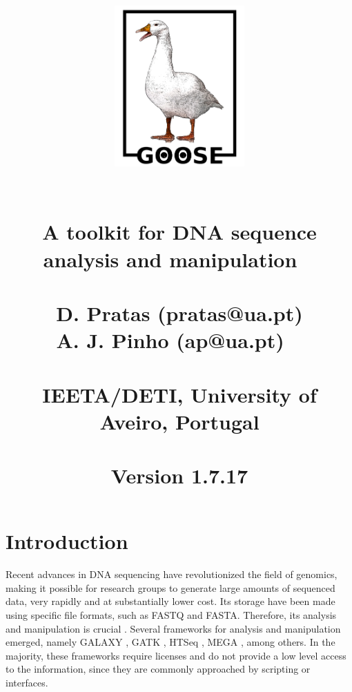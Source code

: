 \documentclass[11pt,journal,compsoc]{report}[1]
\begin{document}

\title{
%
\begin{figure}[h!]
\centerline{\includegraphics[width=5cm]{../imgs/logo.pdf}}
\label{logo}
\end{figure}
~\\
\textbf{A toolkit for DNA sequence\\ analysis and manipulation}
~\\~\\
\large
D. Pratas (pratas@ua.pt)\\
A. J. Pinho (ap@ua.pt)
~\\~\\
\small
IEETA/DETI, University of Aveiro, Portugal\\
~\\
Version 1.7.17
}
\date{}
\maketitle

\tableofcontents

\chapter*{Introduction}

Recent advances in {DNA} sequencing have revolutionized the field of genomics,
making it possible for research groups to generate large amounts of sequenced
data, very rapidly and at substantially lower cost. Its storage have been
made using specific file formats, such as FASTQ and FASTA. Therefore, its
analysis and manipulation is crucial \cite{Buermans-2014a}. Several
frameworks for analysis and manipulation emerged, namely GALAXY
\cite{Giardine-2005a}, GATK \cite{DePristo-2011a}, HTSeq
\cite{Anders-2014a}, MEGA \cite{Kumar-2016a}, among others.
In the majority, these frameworks require licenses and do not provide
a low level access to the information, since they are commonly approached
by scripting or interfaces.
\end{document}
